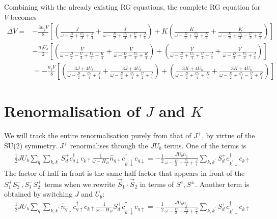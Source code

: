 \documentclass{report}
\numberwithin{equation}{section}
\begin{document}
\begin{appendices}
Combining with the already existing RG equations, the complete RG equation for \(V\) becomes
\begin{equation}\begin{aligned}
	\Delta V =& -\frac{3n_j V}{8}\left[\left(\frac{J}{\omega - \frac{D}{2} + \frac{U_b}{4} + \frac{J}{4}} + \frac{J}{\omega - \frac{D}{2} + \frac{U_b}{4} + \frac{U}{2} + \frac{J}{4}}\right) + K \left(\frac{K}{\omega - \frac{D}{2} + \frac{U_b}{4} + \frac{K}{4}} + \frac{K}{\omega - \frac{D}{2} + \frac{U_b}{4} - \frac{U}{2} + \frac{K}{4}}\right)\right]\\
		 &-\frac{n_jU_b}{2}\left[\left(\frac{V}{\omega - \frac{D}{2} - \frac{U}{2} + \frac{U_b}{4} + \frac{K}{4}} + \frac{V}{\omega - \frac{D}{2} + \frac{U_b}{4} + \frac{K}{4}}\right) + \left(\frac{V}{\omega - \frac{D}{2} + \frac{U_b}{4} + \frac{U}{2} + \frac{J}{4}} + \frac{V}{\omega - \frac{D}{2} + \frac{U_b}{4} + \frac{J}{4}}\right)\right]\\
		 &=-\frac{n_j V}{8}\left[\left(\frac{3J + 4U_b}{\omega - \frac{D}{2} + \frac{U_b}{4} + \frac{J}{4}} + \frac{3J + 4U_b}{\omega - \frac{D}{2} + \frac{U_b}{4} + \frac{U}{2} + \frac{J}{4}}\right) + \left(\frac{3K + 4U_b}{\omega - \frac{D}{2} + \frac{U_b}{4} + \frac{K}{4}} + \frac{3K + 4U_b}{\omega - \frac{D}{2} + \frac{U_b}{4} - \frac{U}{2} + \frac{K}{4}}\right)\right]
\end{aligned}\end{equation}

\section{Renormalisation of \(J\) and \(K\)}
We will track the entire renormalisation purely from that of \(J^+\), by virtue of the SU(2) symmetry. \(J^+\) renormalises through the \(J U_b\) terms. One of the terms is
\begin{equation}\begin{aligned}
	\frac{1}{2} J U_b \sum_{q} \sum_{k,k^\prime} S_d^+ c^\dagger_{q \downarrow} c_{k \uparrow} \frac{1}{\omega - H_D} \hat n_{q \uparrow} c^\dagger_{k^\prime \downarrow}c_{q \downarrow} = -\frac{1}{2}\frac{J U_b n_j}{\omega - \frac{D}{2} + \frac{U_b}{2} + \frac{J}{4}} \sum_{k,k^\prime} S_d^+ c^\dagger_{k^\prime \downarrow} c_{k \uparrow}
\end{aligned}\end{equation}
The factor of half in front is the same half factor that appears in front of the \(S_1^+ S_2^-, S_1^-S_2^+\) terms when we rewrite \(\vec{S}_1\cdot\vec{S}_2\) in terms of \(S^z, S^\pm\). Another term is obtained by switching \(J\) and \(U_b\):
\begin{equation}\begin{aligned}
	\frac{1}{2} J U_b \sum_{q} \sum_{k,k^\prime} \hat n_{q \downarrow} c^\dagger_{q \uparrow} c_{k \uparrow} \frac{1}{\omega - H_D}S_d^+ c^\dagger_{k^\prime \downarrow} c_{q \uparrow} = -\frac{1}{2}\frac{J U_b n_j}{\omega - \frac{D}{2} + \frac{U_b}{2} + \frac{J}{4}} \sum_{k,k^\prime} S_d^+ c^\dagger_{k^\prime \downarrow} c_{k \uparrow}
\end{aligned}\end{equation}


\end{appendices}
\end{document}
